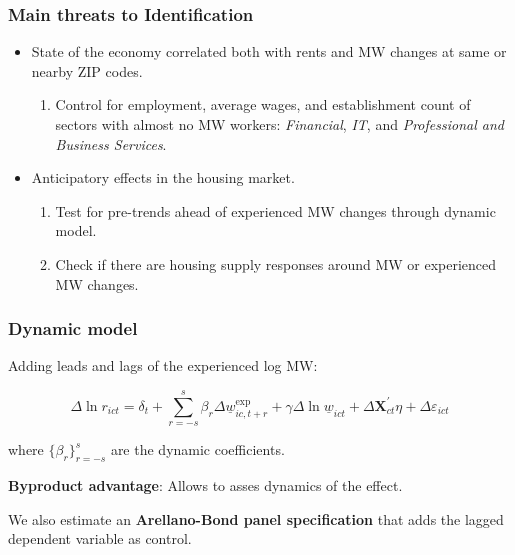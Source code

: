 \begin{frame}
	\frametitle{Main threats to Identification}
	
	\begin{itemize}
		\item State of the economy correlated both with rents and MW changes at 
		same or nearby ZIP codes.
		
		\begin{enumerate}[$\Rightarrow$]
			\vspace{1mm} \item Control for employment, average wages, and establishment 
			count of sectors with almost no MW workers: \textit{Financial}, \textit{IT}, and 
			\textit{Professional and Business Services}.
		\end{enumerate}
		
		\pause
		\vspace{4mm} \item Anticipatory effects in the housing market.
		\begin{enumerate}[$\Rightarrow$]
			\vspace{1mm} \item Test for pre-trends ahead of experienced MW changes 
			through dynamic model.
			\vspace{1mm} \item Check if there are housing supply responses 
		    around MW or experienced MW changes. 
		\end{enumerate}
	\end{itemize}
\end{frame}

\begin{frame}[label = dyn_model]
	\frametitle{Dynamic model}
	
	Adding leads and lags of the experienced log MW:
	
	$$
	\Delta \ln r_{ict} = \delta_t
		+ \sum_{r=-s}^{s} \beta_r \Delta \underline{w}^{\text{exp}}_{ic,t+r}
		+ \gamma \Delta \ln \underline{w}_{ict}
		+ \Delta \mathbf{X}^{'}_{ct}\eta
		+ \Delta \varepsilon_{ict}
    $$
	
	where $\{\beta_r\}_{r=-s}^{s}$ are the dynamic coefficients.
	
	\vspace{1mm}
	\hyperlink{dyn_alt_model}{}
			
	\pause
	\vspace{2mm}
	\textbf{Byproduct advantage}: Allows to asses dynamics of the effect.
	
	\pause
	\vspace{2mm}
	We also estimate an \textbf{Arellano-Bond panel specification} that adds the lagged 
	dependent variable as control.
\end{frame}


